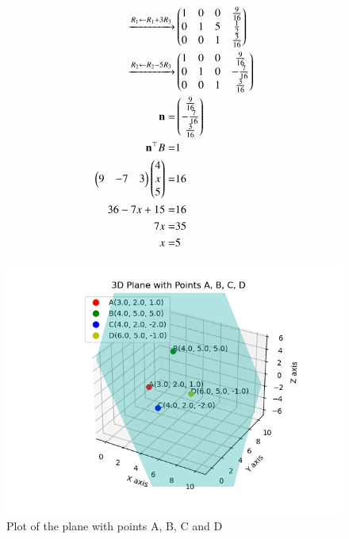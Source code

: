 \documentclass[journal]{IEEEtran}
\begin{document}
\begin{align}
    \xrightarrow{R_1 \leftarrow R_1+3R_3}&\begin{pmatrix}1 & 0 & 0 & \frac{9}{16} \\ 0 & 1 & 5 & \frac{1}{2} \\ 0 & 0 & 1 & \frac{3}{16}\end{pmatrix} \\
    \xrightarrow{R_2 \leftarrow R_2-5R_3}&\begin{pmatrix}1 & 0 & 0 & \frac{9}{16} \\ 0 & 1 & 0 & -\frac{7}{16} \\ 0 & 0 & 1 & \frac{3}{16}\end{pmatrix} \\
    \mathbf{n}=&\begin{pmatrix}\frac{9}{16} \\ -\frac{7}{16} \\ \frac{3}{16}\end{pmatrix} \\
    \mathbf{n}^{\top}B=&1 \\
    \begin{pmatrix}9 & -7 & 3\end{pmatrix}\begin{pmatrix}4 \\ x \\ 5\end{pmatrix}=&16 \\
    36-7x+15=&16 \\
    7x=&35 \\
    x=&5
\end{align}
\begin{figure}[ht!]
	\centering
   	\includegraphics[width=\linewidth]{figs/fig.png}
   	\caption{Plot of the plane with points A, B, C and D}
\label{Plot}
\end{figure}
\end{document}
